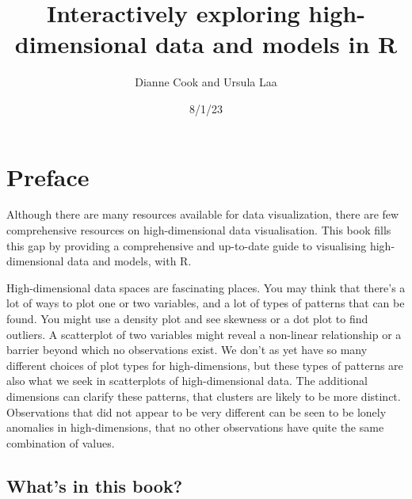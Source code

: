 \documentclass[
  letterpaper,
]{book}
\title{Interactively exploring high-dimensional data and models in R}
\author{Dianne Cook and Ursula Laa}
\date{8/1/23}
\renewcommand*\contentsname{Table of contents}
\newcommand\contentsname{Table of contents}
\begin{document}
\frontmatter
\maketitle
\ifdefined\Shaded\renewenvironment{Shaded}{\begin{tcolorbox}[enhanced, sharp corners, interior hidden, borderline west={3pt}{0pt}{shadecolor}, boxrule=0pt, frame hidden, breakable]}{\end{tcolorbox}}\fi

\renewcommand*\contentsname{Table of contents}
{
\setcounter{tocdepth}{2}
\tableofcontents
}
\mainmatter
{}

\hypertarget{preface}{%
\chapter*{Preface}\label{preface}}


Although there are many resources available for data visualization,
there are few comprehensive resources on high-dimensional data
visualisation. This book fills this gap by providing a comprehensive and
up-to-date guide to visualising high-dimensional data and models, with
R.

High-dimensional data spaces are fascinating places. You may think that
there's a lot of ways to plot one or two variables, and a lot of types
of patterns that can be found. You might use a density plot and see
skewness or a dot plot to find outliers. A scatterplot of two variables
might reveal a non-linear relationship or a barrier beyond which no
observations exist. We don't as yet have so many different choices of
plot types for high-dimensions, but these types of patterns are also
what we seek in scatterplots of high-dimensional data. The additional
dimensions can clarify these patterns, that clusters are likely to be
more distinct. Observations that did not appear to be very different can
be seen to be lonely anomalies in high-dimensions, that no other
observations have quite the same combination of values.

\hypertarget{whats-in-this-book}{%
\section*{What's in this book?}\label{whats-in-this-book}}

\end{document}

